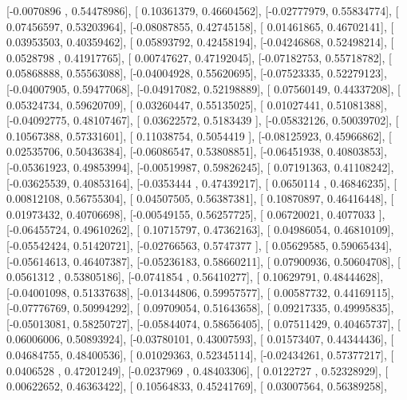 \documentclass{article}
\begin{document}
       [-0.0070896 ,  0.54478986],
       [ 0.10361379,  0.46604562],
       [-0.02777979,  0.55834774],
       [ 0.07456597,  0.53203964],
       [-0.08087855,  0.42745158],
       [ 0.01461865,  0.46702141],
       [ 0.03953503,  0.40359462],
       [ 0.05893792,  0.42458194],
       [-0.04246868,  0.52498214],
       [ 0.0528798 ,  0.41917765],
       [ 0.00747627,  0.47192045],
       [-0.07182753,  0.55718782],
       [ 0.05868888,  0.55563088],
       [-0.04004928,  0.55620695],
       [-0.07523335,  0.52279123],
       [-0.04007905,  0.59477068],
       [-0.04917082,  0.52198889],
       [ 0.07560149,  0.44337208],
       [ 0.05324734,  0.59620709],
       [ 0.03260447,  0.55135025],
       [ 0.01027441,  0.51081388],
       [-0.04092775,  0.48107467],
       [ 0.03622572,  0.5183439 ],
       [-0.05832126,  0.50039702],
       [ 0.10567388,  0.57331601],
       [ 0.11038754,  0.5054419 ],
       [-0.08125923,  0.45966862],
       [ 0.02535706,  0.50436384],
       [-0.06086547,  0.53808851],
       [-0.06451938,  0.40803853],
       [-0.05361923,  0.49853994],
       [-0.00519987,  0.59826245],
       [ 0.07191363,  0.41108242],
       [-0.03625539,  0.40853164],
       [-0.0353444 ,  0.47439217],
       [ 0.0650114 ,  0.46846235],
       [ 0.00812108,  0.56755304],
       [ 0.04507505,  0.56387381],
       [ 0.10870897,  0.46416448],
       [ 0.01973432,  0.40706698],
       [-0.00549155,  0.56257725],
       [ 0.06720021,  0.4077033 ],
       [-0.06455724,  0.49610262],
       [ 0.10715797,  0.47362163],
       [ 0.04986054,  0.46810109],
       [-0.05542424,  0.51420721],
       [-0.02766563,  0.5747377 ],
       [ 0.05629585,  0.59065434],
       [-0.05614613,  0.46407387],
       [-0.05236183,  0.58660211],
       [ 0.07900936,  0.50604708],
       [ 0.0561312 ,  0.53805186],
       [-0.0741854 ,  0.56410277],
       [ 0.10629791,  0.48444628],
       [-0.04001098,  0.51337638],
       [-0.01344806,  0.59957577],
       [ 0.00587732,  0.44169115],
       [-0.07776769,  0.50994292],
       [ 0.09709054,  0.51643658],
       [ 0.09217335,  0.49995835],
       [-0.05013081,  0.58250727],
       [-0.05844074,  0.58656405],
       [ 0.07511429,  0.40465737],
       [ 0.06006006,  0.50893924],
       [-0.03780101,  0.43007593],
       [ 0.01573407,  0.44344436],
       [ 0.04684755,  0.48400536],
       [ 0.01029363,  0.52345114],
       [-0.02434261,  0.57377217],
       [ 0.0406528 ,  0.47201249],
       [-0.0237969 ,  0.48403306],
       [ 0.0122727 ,  0.52328929],
       [ 0.00622652,  0.46363422],
       [ 0.10564833,  0.45241769],
       [ 0.03007564,  0.56389258],
\end{document}
